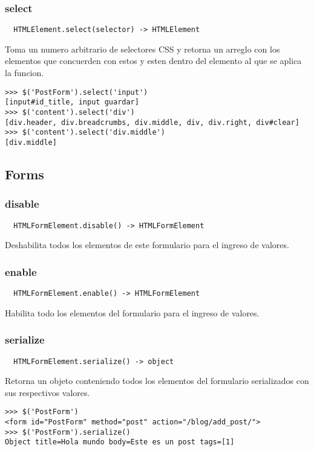 \subsubsection*{select}
\begin{verbatim}
  HTMLElement.select(selector) -> HTMLElement
\end{verbatim}
Toma un numero arbitrario de selectores CSS y retorna un arreglo con los elementos que concuerden con estos y esten dentro del elemento al que se aplica la funcion.

\begin{lstlisting}[style=consola]
>>> $('PostForm').select('input')
[input#id_title, input guardar]
>>> $('content').select('div')
[div.header, div.breadcrumbs, div.middle, div, div.right, div#clear]
>>> $('content').select('div.middle')
[div.middle]
\end{lstlisting}

\subsection{Forms}
\subsubsection*{disable}
\begin{verbatim}
  HTMLFormElement.disable() -> HTMLFormElement
\end{verbatim}
Deshabilita todos los elementos de este formulario para el ingreso de valores.

\subsubsection*{enable}
\begin{verbatim}
  HTMLFormElement.enable() -> HTMLFormElement
\end{verbatim}
Habilita todo los elementos del formulario para el ingreso de valores.

\subsubsection*{serialize}
\begin{verbatim}
  HTMLFormElement.serialize() -> object
\end{verbatim}
Retorna un objeto conteniendo todos los elementos del formulario serializados con sus respectivos valores.

\begin{lstlisting}[style=consola]
>>> $('PostForm')
<form id="PostForm" method="post" action="/blog/add_post/">
>>> $('PostForm').serialize()
Object title=Hola mundo body=Este es un post tags=[1]
\end{lstlisting}

